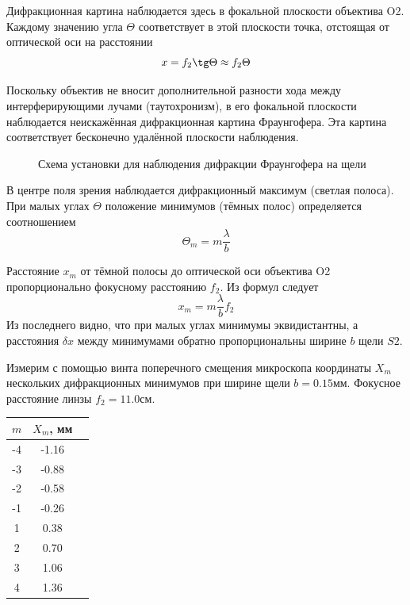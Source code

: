 \documentclass[14pt]{article}
\begin{document}
Дифракционная картина наблюдается здесь в фокальной плоскости объектива O2. Каждому значению угла $\Theta$ соответствует в этой плоскости точка, отстоящая от оптической оси на расстоянии
$$
	x = f_2 \tg\Theta \approx f_2\Theta
$$

Поскольку объектив не вносит дополнительной разности хода между интерферирующими лучами (таутохронизм), в его фокальной плоскости наблюдается неискажённая дифракционная картина Фраунгофера. Эта картина соответствует бесконечно удалённой плоскости наблюдения.

\begin{figure}[h!]
	\caption{Схема установки для наблюдения дифракции Фраунгофера на щели}
	\label{fig:image}
\end{figure}

В центре поля зрения наблюдается дифракционный максимум (светлая полоса). При малых углах $\Theta$ положение минимумов (тёмных полос) определяется соотношением
$$
	\Theta_m = m\frac{\lambda}{b}
$$

Расстояние $x_m$ от тёмной полосы до оптической оси объектива O2 пропорционально фокусному расстоянию $f_2$. Из формул следует
$$
	x_m = m\frac{\lambda}{b}f_2
$$
Из последнего видно, что при малых углах минимумы эквидистантны, а расстояния $\delta x$ между минимумами обратно пропорциональны ширине $b$ щели $S2$.

\vspace{1cm}
Измерим с помощью винта поперечного смещения микроскопа координаты $X_m$ нескольких дифракционных минимумов при ширине щели $b = 0.15$мм. Фокусное расстояние линзы $f_2 = 11.0$см.

\begin{center}
\begin{tabular}{|c|c|c|}
\hline
$m$	&	$X_m$, мм	\\
\hline
-4	&	-1.16	\\ %
\hline
-3	&	-0.88	\\ %
\hline
-2	&	-0.58	\\ %
\hline
-1	&	-0.26	\\ %
\hline
1	&	0.38	\\ %
\hline
2	&	0.70	\\ %
\hline
3	&	1.06	\\ %
\hline
4	&	1.36	\\
\hline
\end{tabular}
\end{center}
\end{document}
